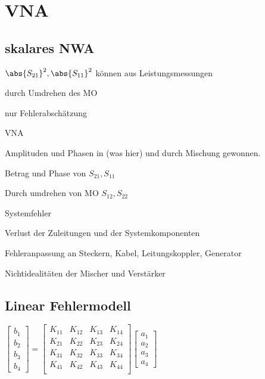 \section{VNA}
\renewcommand{\ort}{topics/VNA}


\subsection{skalares NWA}



\begin{pitemize}
    \item $\abs{S_{21}}^2 ,\abs{S_{11}}^2$ können aus Leistungsmessungen
    \item durch Umdrehen des MO
    \item nur Fehlerabschätzung
\end{pitemize}

VNA




\begin{pitemize}
    \item Amplituden und Phasen in (was hier) und durch Mischung gewonnen.
    \item Betrag und Phase von $S_{21}, S_{11}$
    \item Durch umdrehen von MO $S_{12}, S_{22}$
    \item Systemfehler
    \begin{pitemize}
        \item Verlust der Zuleitungen und der Systemkomponenten
        \item Fehleranpassung an Steckern, Kabel, Leitungskoppler, Generator
        \item Nichtidealitäten der Mischer und Verstärker
    \end{pitemize} 
\end{pitemize}



\subsection{Linear Fehlermodell}


$\begin{bmatrix}
    b_1 \\ b_2 \\b_3 \\ b_4
\end{bmatrix} = 
\begin{bmatrix}
    K_{11} & K_{12} & K_{13} & K_{14} \\
    K_{21} & K_{22} & K_{23} & K_{24} \\
    K_{31} & K_{32} & K_{33} & K_{34} \\
    K_{41} & K_{42} & K_{43} & K_{44} \\
\end{bmatrix} \begin{bmatrix}
    a_1 \\ a_2 \\ a_3 \\ a_4
\end{bmatrix}$


